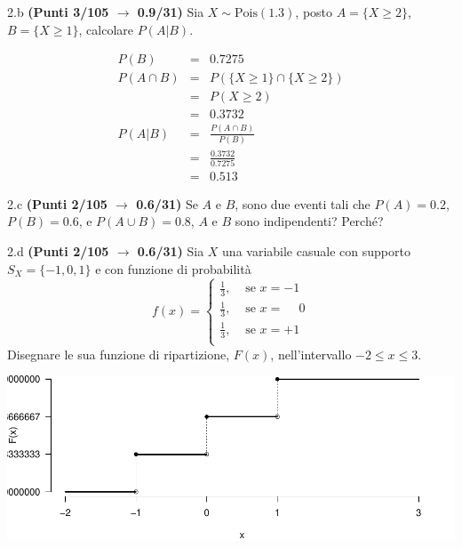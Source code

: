 \documentclass[
  11pt,
]{book}
\theoremstyle{mytheoremstyle}
\theoremstyle{mydefstyle}
\newenvironment{sol}
  {
  \begin{tcolorbox}[enhanced,breakable,arc=0.1mm,boxrule=1pt,colback=white,colframe=iblue,
  title=\bf \fontfamily{lmss}\selectfont \hspace{.5 cm} Soluzione,drop fuzzy shadow]

}{
\end{tcolorbox}
  }
\begin{document}
2.b \textbf{(Punti 3/105 \(\rightarrow\) 0.9/31)} Sia \(X\sim\text{Pois}(1.3)\), posto \(A=\{X\geq 2\}\), \(B=\{X\geq 1\}\), calcolare \(P(A|B)\).

\begin{sol}
\begin{eqnarray*}
  P(B) &=&  0.7275\\
  P(A\cap B) &=& P( \{X \geq 1\} \cap \{X \geq 2\})\\
             &=& P(  X \geq 2)\\
             &=& 0.3732\\
  P(A|B)     &=& \frac{P(A\cap B)}{P(B)}\\
             &=& \frac{0.3732}{0.7275}\\
             &=& 0.513
\end{eqnarray*}

\end{sol}

2.c \textbf{(Punti 2/105 \(\rightarrow\) 0.6/31)} Se \(A\) e \(B\), sono due eventi tali che \(P(A)=0.2\), \(P(B)=0.6\), e \(P(A\cup B)=0.8\), \(A\) e \(B\) sono indipendenti? Perché?

2.d \textbf{(Punti 2/105 \(\rightarrow\) 0.6/31)} Sia \(X\) una variabile casuale con supporto \(S_X=\{-1,0,1\}\) e con funzione di probabilità
\[
f(x)=\begin{cases}
\frac 13, &\text{ se $x=-1$}\\
\frac 13, &\text{ se $x=\phantom{-} 0$}\\
\frac 13, &\text{ se $x=+ 1$}\\
\end{cases}
\]
Disegnare le sua funzione di ripartizione, \(F(x)\), nell'intervallo \(-2\leq x\leq 3\).

\begin{sol}

\begin{center}\includegraphics{Esami_passati_con_soluzioni_files/figure-latex/2024-119-1} \end{center}

\end{sol}
\end{document}
